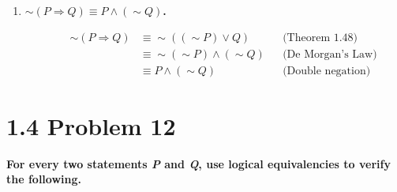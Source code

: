\documentclass[10pt]{article}
\begin{document}
\begin{enumerate}[label=(\alph*)]
    \item \textbf{$\sim (P \Rightarrow Q) \equiv P \wedge (\sim Q)$.}

    \begin{align*}
        && \sim (P \Rightarrow Q) &\equiv \sim ((\sim P) \vee Q) && \text{(Theorem 1.48)} \\
        && &\equiv \sim (\sim P) \wedge (\sim Q) && \text{(De Morgan's Law)} \\
        && &\equiv P \wedge (\sim Q) && \text{(Double negation)}
    \end{align*}

\end{enumerate}



\section{1.4 Problem 12}
\textbf{For every two statements \textit{P} and \textit{Q}, use logical equivalencies
to verify the following.}
\end{document}
